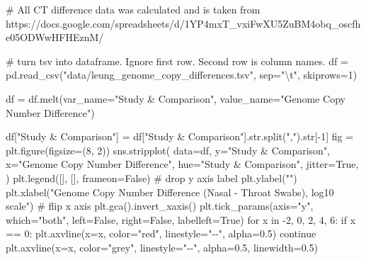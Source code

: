 \documentclass[
  letterpaper,
  DIV=11,
  numbers=noendperiod]{scrartcl}
\newenvironment{Shaded}{\begin{snugshade}}{\end{snugshade}}
\newcommand{\BuiltInTok}[1]{\textcolor[rgb]{0.00,0.23,0.31}{#1}}
\newcommand{\CharTok}[1]{\textcolor[rgb]{0.13,0.47,0.30}{#1}}
\newcommand{\CommentTok}[1]{\textcolor[rgb]{0.37,0.37,0.37}{#1}}
\newcommand{\ControlFlowTok}[1]{\textcolor[rgb]{0.00,0.23,0.31}{#1}}
\newcommand{\DecValTok}[1]{\textcolor[rgb]{0.68,0.00,0.00}{#1}}
\newcommand{\FloatTok}[1]{\textcolor[rgb]{0.68,0.00,0.00}{#1}}
\newcommand{\KeywordTok}[1]{\textcolor[rgb]{0.00,0.23,0.31}{#1}}
\newcommand{\NormalTok}[1]{\textcolor[rgb]{0.00,0.23,0.31}{#1}}
\newcommand{\OperatorTok}[1]{\textcolor[rgb]{0.37,0.37,0.37}{#1}}
\newcommand{\StringTok}[1]{\textcolor[rgb]{0.13,0.47,0.30}{#1}}
\newcommand{\VariableTok}[1]{\textcolor[rgb]{0.07,0.07,0.07}{#1}}
\begin{document}
\begin{Shaded}
\begin{Highlighting}[]
\CommentTok{\# All CT difference data was calculated and is taken from https://docs.google.com/spreadsheets/d/1YP4mxT\_vxiFwXU5ZuBM4obq\_oscfhe05ODWwHFHEznM/}

\CommentTok{\# turn tsv into dataframe. Ignore first row. Second row is column names.}
\NormalTok{df }\OperatorTok{=}\NormalTok{ pd.read\_csv(}\StringTok{"data/leung\_genome\_copy\_differences.tsv"}\NormalTok{, sep}\OperatorTok{=}\StringTok{"}\CharTok{\textbackslash{}t}\StringTok{"}\NormalTok{, skiprows}\OperatorTok{=}\DecValTok{1}\NormalTok{)}


\NormalTok{df }\OperatorTok{=}\NormalTok{ df.melt(var\_name}\OperatorTok{=}\StringTok{"Study \& Comparison"}\NormalTok{, value\_name}\OperatorTok{=}\StringTok{"Genome Copy Number Difference"}\NormalTok{)}

\NormalTok{df[}\StringTok{"Study \& Comparison"}\NormalTok{] }\OperatorTok{=}\NormalTok{ df[}\StringTok{"Study \& Comparison"}\NormalTok{].}\BuiltInTok{str}\NormalTok{.split(}\StringTok{","}\NormalTok{).}\BuiltInTok{str}\NormalTok{[}\OperatorTok{{-}}\DecValTok{1}\NormalTok{]}
\NormalTok{fig }\OperatorTok{=}\NormalTok{ plt.figure(figsize}\OperatorTok{=}\NormalTok{(}\DecValTok{8}\NormalTok{, }\DecValTok{2}\NormalTok{))}
\NormalTok{sns.stripplot(}
\NormalTok{    data}\OperatorTok{=}\NormalTok{df,}
\NormalTok{    y}\OperatorTok{=}\StringTok{"Study \& Comparison"}\NormalTok{,}
\NormalTok{    x}\OperatorTok{=}\StringTok{"Genome Copy Number Difference"}\NormalTok{,}
\NormalTok{    hue}\OperatorTok{=}\StringTok{"Study \& Comparison"}\NormalTok{,}
\NormalTok{    jitter}\OperatorTok{=}\VariableTok{True}\NormalTok{,}
\NormalTok{)}
\NormalTok{plt.legend([], [], frameon}\OperatorTok{=}\VariableTok{False}\NormalTok{)}
\CommentTok{\# drop y axis label}
\NormalTok{plt.ylabel(}\StringTok{""}\NormalTok{)}
\NormalTok{plt.xlabel(}\StringTok{"Genome Copy Number Difference (Nasal {-} Throat Swabs), log10 scale"}\NormalTok{)}
\CommentTok{\# flip x axis}
\NormalTok{plt.gca().invert\_xaxis()}
\NormalTok{plt.tick\_params(axis}\OperatorTok{=}\StringTok{"y"}\NormalTok{, which}\OperatorTok{=}\StringTok{"both"}\NormalTok{, left}\OperatorTok{=}\VariableTok{False}\NormalTok{, right}\OperatorTok{=}\VariableTok{False}\NormalTok{, labelleft}\OperatorTok{=}\VariableTok{True}\NormalTok{)}
\ControlFlowTok{for}\NormalTok{ x }\KeywordTok{in} \OperatorTok{{-}}\DecValTok{2}\NormalTok{, }\DecValTok{0}\NormalTok{, }\DecValTok{2}\NormalTok{, }\DecValTok{4}\NormalTok{, }\DecValTok{6}\NormalTok{:}
    \ControlFlowTok{if}\NormalTok{ x }\OperatorTok{==} \DecValTok{0}\NormalTok{:}
\NormalTok{        plt.axvline(x}\OperatorTok{=}\NormalTok{x, color}\OperatorTok{=}\StringTok{"red"}\NormalTok{, linestyle}\OperatorTok{=}\StringTok{"{-}{-}"}\NormalTok{, alpha}\OperatorTok{=}\FloatTok{0.5}\NormalTok{)}
        \ControlFlowTok{continue}
\NormalTok{    plt.axvline(x}\OperatorTok{=}\NormalTok{x, color}\OperatorTok{=}\StringTok{"grey"}\NormalTok{, linestyle}\OperatorTok{=}\StringTok{"{-}{-}"}\NormalTok{, alpha}\OperatorTok{=}\FloatTok{0.5}\NormalTok{, linewidth}\OperatorTok{=}\FloatTok{0.5}\NormalTok{)}


\end{Highlighting}
\end{Shaded}
\end{document}
